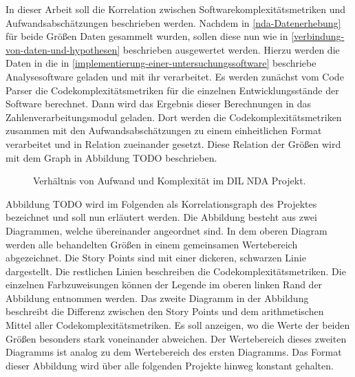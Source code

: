 In dieser Arbeit soll die Korrelation zwischen
Softwarekomplexitätsmetriken und Aufwandsabschätzungen beschrieben
werden. Nachdem in \ref{nda-Datenerhebung} für beide Grö\ss en Daten gesammelt wurden, sollen
diese nun wie in \ref{verbindung-von-daten-und-hypothesen} beschrieben ausgewertet werden. Hierzu werden die
Daten in die in \ref{implementierung-einer-untersuchungssoftware} beschriebe Analysesoftware geladen und mit ihr
verarbeitet. Es werden zunächst vom Code Parser die
Codekomplexitätsmetriken für die einzelnen Entwicklungsstände der
Software berechnet. Dann wird das Ergebnis dieser Berechnungen in das
Zahlenverarbeitungsmodul geladen. Dort werden die
Codekomplexitätsmetriken zusammen mit den Aufwandsabschätzungen zu einem
einheitlichen Format verarbeitet und in Relation zueinander gesetzt.
Diese Relation der Grö\ss en wird mit dem Graph in Abbildung TODO
beschrieben.

\begin{figure}\label{nda-graph}
  \begin{center}
      
  \end{center}
  \caption{Verhältnis von Aufwand und Komplexität im DIL NDA Projekt.}
\end{figure}

Abbildung TODO wird im Folgenden als Korrelationsgraph des Projektes
bezeichnet und soll nun erläutert werden. Die Abbildung besteht aus zwei
Diagrammen, welche übereinander angeordnet sind. In dem oberen Diagram
werden alle behandelten Grö\ss en in einem gemeinsamen Wertebereich
abgezeichnet. Die Story Points sind mit einer dickeren, schwarzen Linie
dargestellt. Die restlichen Linien beschreiben die
Codekomplexitätsmetriken. Die einzelnen Farbzuweisungen können der
Legende im oberen linken Rand der Abbildung entnommen werden. Das zweite
Diagramm in der Abbildung beschreibt die Differenz zwischen den Story
Points und dem arithmetischen Mittel aller Codekomplexitätsmetriken. Es
soll anzeigen, wo die Werte der beiden Grö\ss en besonders stark
voneinander abweichen. Der Wertebereich dieses zweiten Diagramms ist
analog zu dem Wertebereich des ersten Diagramms. Das Format dieser
Abbildung wird über alle folgenden Projekte hinweg konstant gehalten.

